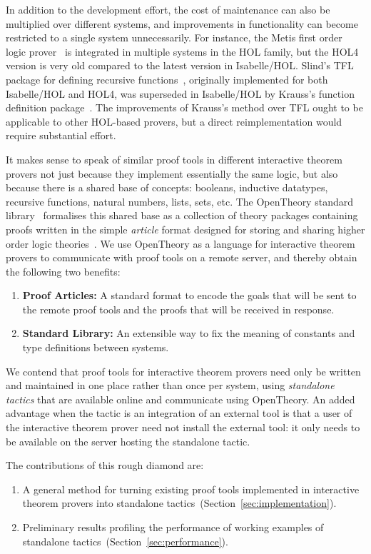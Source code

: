 \documentclass{llncs}
\newcommand{\OpenTheory}{OpenTheory\xspace}
\newcommand{\secref}[1]{Section~\ref{sec:#1}}
\begin{document}
In addition to the development effort, the cost of maintenance can also be multiplied over different systems, and improvements in functionality can become restricted to a single system unnecessarily.
For instance, the Metis first order logic prover~\cite{hurd2003d} is integrated in multiple systems in the HOL family, but the HOL4 version is very old compared to the latest version in Isabelle/HOL.
Slind's TFL package for defining recursive functions~\cite{slindphd}, originally implemented for both Isabelle/HOL and HOL4, was superseded in Isabelle/HOL by Krauss's function definition package~\cite{DBLP:journals/jar/Krauss10}.
The improvements of Krauss's method over TFL ought to be applicable to other HOL-based provers, but a direct reimplementation would require substantial effort.

It makes sense to speak of similar proof tools in different interactive theorem provers not just because they implement essentially the same logic, but also because there is a shared base of concepts: booleans, inductive datatypes, recursive functions, natural numbers, lists, sets, etc.
The \OpenTheory standard library~\cite{hurd2011} formalises this shared base as a collection of theory packages containing proofs written in the simple \emph{article} format designed for storing and sharing higher order logic theories~\cite{hurd2009}.
We use \OpenTheory as a language for interactive theorem provers to communicate with proof tools on a remote server, and thereby obtain the following two benefits:
\begin{enumerate}
\item\textbf{Proof Articles:} A standard format to encode the goals that will be sent to the remote proof tools and the proofs that will be received in response.

\item\textbf{Standard Library:} An extensible way to fix the meaning of constants and type definitions between systems.
\end{enumerate}

We contend that proof tools for interactive theorem provers need only be written and maintained in one place rather than once per system, using \emph{standalone tactics} that are available online and communicate using \OpenTheory.
An added advantage when the tactic is an integration of an external tool is that a user of the interactive theorem prover need not install the external tool: it only needs to be available on the server hosting the standalone tactic.

The contributions of this rough diamond are:
\begin{enumerate}
\item A general method for turning existing proof tools implemented in interactive theorem provers into standalone tactics~(\secref{implementation}).

\item Preliminary results profiling the performance of working examples of standalone tactics~(\secref{performance}).
\end{enumerate}
\end{document}
